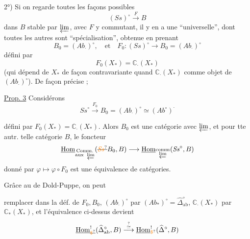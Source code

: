 2°) Si on regarde toutes les façons possibles
 
\[
(\mathit{Ss})^{\circ}\xrightarrow{F}B
\]
dans $B$ stable par $\varprojlim$, avec $F$ y
commutant, il y en a  une
``universelle'', dont toutes les autres sont
``spécialisation'', obtenue en prenant
\[
B_0=(\mathit{Ab}_{\cdot})^{\circ},\quad\text{et}\quad
F_0:(\mathit{Ss})^{\circ}\longrightarrow B_0=(\mathit{Ab}_{\cdot})^{\circ}
\]
défini par
\[
F_0(X_{\ast})=\mathbb C_{\cdot}(X_{\ast})
\]
(qui dépend de $X_{\ast}$ de façon contravariante
quand $\mathbb C_{\cdot}(X_{\ast})$  comme
objet de $(\mathit{Ab}_{\cdot})^{\circ}$). De façon précise ;

\uline{Prop. 3} Considérons
\[
\mathit{Ss}^{\circ}\xrightarrow{F_0}B_0=(\mathit{Ab}_{\cdot})^{\circ}
\simeq(\mathit{Ab}^{\circ})^{\cdot}
\]

défini par $F_0(X_{\ast})=\mathbb C_{\cdot}(X_{\ast})$. Alors
$B_0$ est une catégorie  avec $\varprojlim$, et
pour tte autr. telle catégorie $B$,
le foncteur
\[
\underline{\operatorname{Hom}}_{\substack{\mathrm{Comm.}\\\mathrm{aux}\ \varprojlim}}
(\deleted{\unsure{\mathit{Ss}}}B_0,B)\longrightarrow
\underline{\operatorname{Hom}}_{\substack{\mathrm{comm}\\\varprojlim}}(\mathit{Ss}^{\circ},B)
\]
donné par $\varphi\longmapsto\varphi\circ F_0$
est une équivalence de catégories.

Grâce au  de Dold-Puppe, on peut

remplacer dans la déf. de
$F_0,B_0$, $(\mathit{Ab}_{\cdot})^{\circ}$ par $(\mathit{Ab}_{\ast})^{\circ}=\widehat\Delta_{\mathrm{ab}}^{\circ}$,
$\mathbb C_{\cdot}(X_{\ast})$ par $\mathbb C_{\ast}(X_{\ast})$, et l'équivalence ci-dessus
devient
\[
\underline{\operatorname{Hom}}_{\deleted{\unsure{\$}}}^{!}(\widehat\Delta_{\mathrm{ab}}^{\circ},B)
\overset{\overset{?}{\simeq}}{\longrightarrow}
\underline{\operatorname{Hom}}_{\unsure{\$}}^{!}(\widehat\Delta^{\circ},B)
\]

